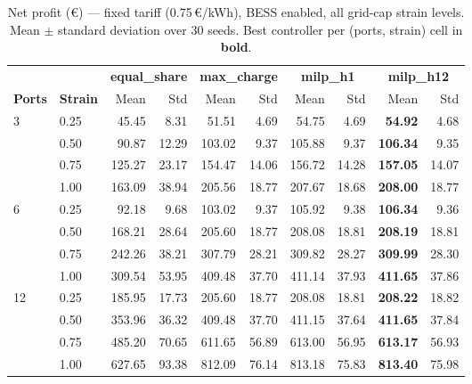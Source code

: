\begin{table}[!htb]
\centering
\caption{Net profit (€) — fixed tariff (0.75\,€/kWh), BESS enabled,
         all grid-cap strain levels.  Mean $\pm$ standard deviation
         over 30 seeds.  Best controller per (ports, strain) cell in
         \textbf{bold}.}
\label{tab:gc_fixed_bess_profit}
\setlength{\tabcolsep}{4.5pt}
\begin{tabular}{ll rrrrrrrr}
\toprule
 & & \multicolumn{2}{c}{\textbf{equal\_share}}
   & \multicolumn{2}{c}{\textbf{max\_charge}}
   & \multicolumn{2}{c}{\textbf{milp\_h1}}
   & \multicolumn{2}{c}{\textbf{milp\_h12}} \\
\cmidrule(lr){3-4}\cmidrule(lr){5-6}\cmidrule(lr){7-8}\cmidrule(lr){9-10}
\textbf{Ports} & \textbf{Strain} &
  Mean & Std & Mean & Std & Mean & Std & Mean & Std \\
\midrule
\multirow{4}{*}{3}
  & 0.25 &  45.45 &  8.31 &  51.51 &  4.69 &  54.75 &  4.69 & \textbf{54.92} &  4.68 \\
  & 0.50 &  90.87 & 12.29 & 103.02 &  9.37 & 105.88 &  9.37 & \textbf{106.34} &  9.35 \\
  & 0.75 & 125.27 & 23.17 & 154.47 & 14.06 & 156.72 & 14.28 & \textbf{157.05} & 14.07 \\
  & 1.00 & 163.09 & 38.94 & 205.56 & 18.77 & 207.67 & 18.68 & \textbf{208.00} & 18.77 \\
\midrule
\multirow{4}{*}{6}
  & 0.25 &  92.18 &  9.68 & 103.02 &  9.37 & 105.92 &  9.38 & \textbf{106.34} &  9.36 \\
  & 0.50 & 168.21 & 28.64 & 205.60 & 18.77 & 208.08 & 18.81 & \textbf{208.19} & 18.81 \\
  & 0.75 & 242.26 & 38.21 & 307.79 & 28.21 & 309.82 & 28.27 & \textbf{309.99} & 28.30 \\
  & 1.00 & 309.54 & 53.95 & 409.48 & 37.70 & 411.14 & 37.93 & \textbf{411.65} & 37.86 \\
\midrule
\multirow{4}{*}{12}
  & 0.25 & 185.95 & 17.73 & 205.60 & 18.77 & 208.08 & 18.81 & \textbf{208.22} & 18.82 \\
  & 0.50 & 353.96 & 36.32 & 409.48 & 37.70 & 411.15 & 37.64 & \textbf{411.65} & 37.84 \\
  & 0.75 & 485.20 & 70.65 & 611.65 & 56.89 & 613.00 & 56.95 & \textbf{613.17} & 56.93 \\
  & 1.00 & 627.65 & 93.38 & 812.09 & 76.14 & 813.18 & 75.83 & \textbf{813.40} & 75.98 \\
\bottomrule
\end{tabular}
\end{table}

